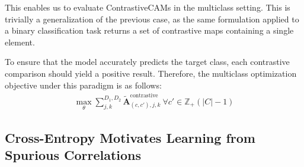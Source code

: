 \documentclass{article}
\theoremstyle{plain}
\theoremstyle{definition}
\theoremstyle{remark}
\begin{document}
This enables us to evaluate ContrastiveCAMs in the multiclass setting. This is trivially a generalization of the previous case, as the same formulation applied to a binary classification task returns a set of contrastive maps containing a single element.

To ensure that the model accurately predicts the target class, each contrastive comparison should yield a positive result. Therefore, the multiclass optimization objective under this paradigm is as follows:
\begin{gather}
	\max_{\theta} \sum^{D_1,D_2}_{j,k}\tilde{\mathcal{\bm{A}}}_{(c, c'),j,k}^{\text{contrastive}}\ \forall c' \in \mathbb{Z}_{+}(|C| - 1)
\end{gather}

\subsection{Cross-Entropy Motivates Learning from Spurious Correlations}
\end{document}
